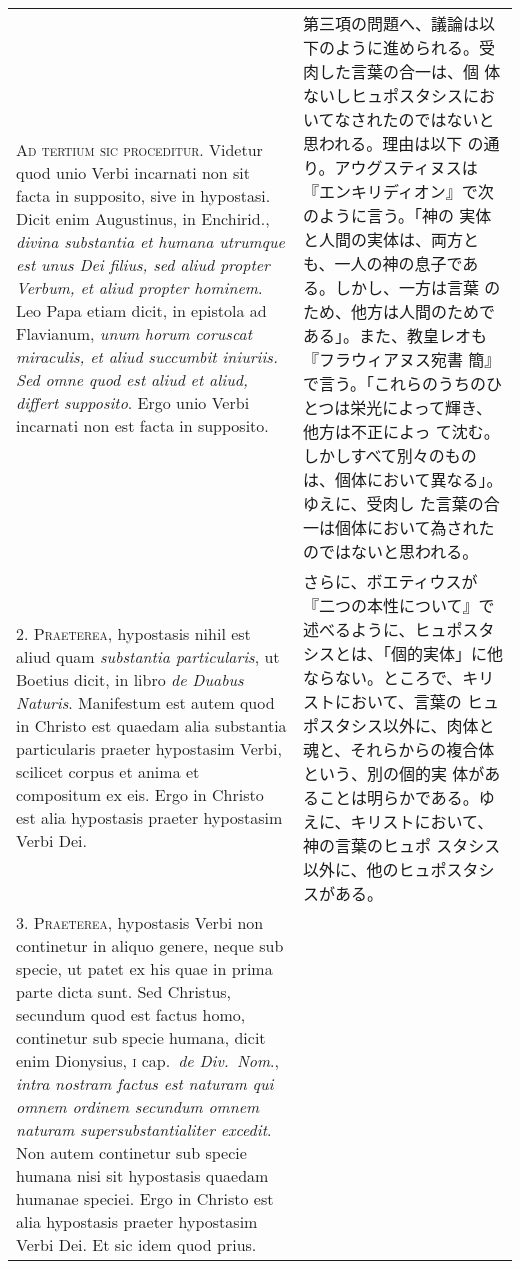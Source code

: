 \documentclass[10pt]{jsarticle} %
\begin{document}
\begin{longtable}{p{21em}p{21em}}



{\Huge A}{\scshape d tertium sic proceditur}. Videtur quod unio Verbi
incarnati non sit facta in supposito, sive in hypostasi. Dicit enim
Augustinus, in Enchirid., {\itshape divina substantia et humana
utrumque est unus Dei filius, sed aliud propter Verbum, et aliud
propter hominem}. Leo Papa etiam dicit, in epistola ad Flavianum,
{\itshape unum horum coruscat miraculis, et aliud succumbit
iniuriis. Sed omne quod est aliud et aliud, differt supposito}. Ergo
unio Verbi incarnati non est facta in supposito.

&

第三項の問題へ、議論は以下のように進められる。受肉した言葉の合一は、個
体ないしヒュポスタシスにおいてなされたのではないと思われる。理由は以下
の通り。アウグスティヌスは『エンキリディオン』で次のように言う。「神の
実体と人間の実体は、両方とも、一人の神の息子である。しかし、一方は言葉
のため、他方は人間のためである」。また、教皇レオも『フラウィアヌス宛書
簡』で言う。「これらのうちのひとつは栄光によって輝き、他方は不正によっ
て沈む。しかしすべて別々のものは、個体において異なる」。ゆえに、受肉し
た言葉の合一は個体において為されたのではないと思われる。


\\



2. {\scshape Praeterea}, hypostasis nihil est aliud quam {\itshape
substantia particularis}, ut Boetius dicit, in libro {\itshape de
Duabus Naturis}. Manifestum est autem quod in Christo est quaedam alia
substantia particularis praeter hypostasim Verbi, scilicet corpus et
anima et compositum ex eis. Ergo in Christo est alia hypostasis
praeter hypostasim Verbi Dei.

&

さらに、ボエティウスが『二つの本性について』で述べるように、ヒュポスタ
シスとは、「個的実体」に他ならない。ところで、キリストにおいて、言葉の
ヒュポスタシス以外に、肉体と魂と、それらからの複合体という、別の個的実
体があることは明らかである。ゆえに、キリストにおいて、神の言葉のヒュポ
スタシス以外に、他のヒュポスタシスがある。


\\



3. {\scshape Praeterea}, hypostasis Verbi non continetur in aliquo
genere, neque sub specie, ut patet ex his quae in prima parte dicta
sunt. Sed Christus, secundum quod est factus homo, continetur sub
specie humana, dicit enim Dionysius, {\scshape i} cap.~{\itshape de
Div.~Nom}., {\itshape intra nostram factus est naturam qui omnem
ordinem secundum omnem naturam supersubstantialiter excedit}. Non
autem continetur sub specie humana nisi sit hypostasis quaedam humanae
speciei. Ergo in Christo est alia hypostasis praeter hypostasim Verbi
Dei. Et sic idem quod prius.


\end{longtable}
\end{document}
